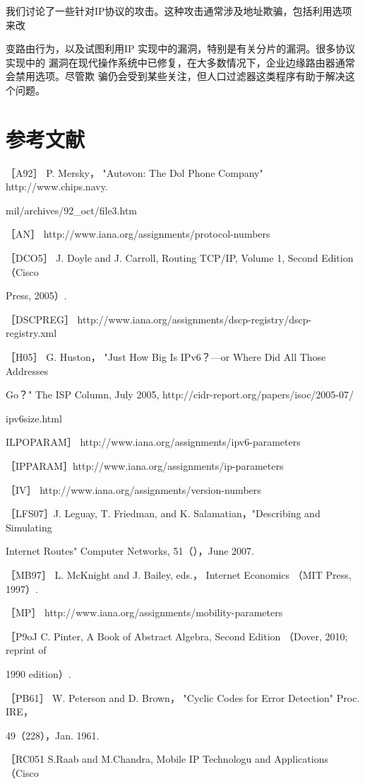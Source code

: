我们讨论了一些针对IP协议的攻击。这种攻击通常涉及地址欺骗，包括利用选项来改

变路由行为，以及试图利用IP 实现中的漏洞，特别是有关分片的漏洞。很多协议实现中的
漏洞在现代操作系统中已修复，在大多数情况下，企业边缘路由器通常会禁用选项。尽管欺
骗仍会受到某些关注，但人口过滤器这类程序有助于解决这个问题。

\section{参考文献}

［A92］ P. Mersky， "Autovon: The Dol Phone Company" http://www.chips.navy.

mil/archives/92\_oct/file3.htm

［AN］ http://www.iana.org/assignments/protocol-numbers

［DCO5］ J. Doyle and J. Carroll, Routing TCP/IP, Volume 1, Second Edition （Cisco

Press, 2005）.

［DSCPREG］ http://www.iana.org/assignments/dscp-registry/dscp-registry.xml

［H05］ G. Huston， "Just How Big Is IPv6？—or Where Did All Those Addresses

Go？" The ISP Column, July 2005, http://cidr-report.org/papers/isoc/2005-07/

ipv6size.html

ILPOPARAM］ http://www.iana.org/assignments/ipv6-parameters

［IPPARAM］http://www.iana.org/assignments/ip-parameters

［IV］ http://www.iana.org/assignments/version-numbers

［LFS07］J. Leguay, T. Friedman, and K. Salamatian，"Describing and Simulating

Internet Routes" Computer Networks, 51（），June 2007.

［MB97］ L. McKnight and J. Bailey, eds.， Internet Economics （MIT Press, 1997）.

［MP］ http://www.iana.org/assignments/mobility-parameters

［P9oJ C. Pinter, A Book of Abstract Algebra, Second Edition （Dover, 2010; reprint of

1990 edition）.

［PB61］ W. Peterson and D. Brown， "Cyclic Codes for Error Detection" Proc. IRE，

49（228），Jan. 1961.

［RC051 S.Raab and M.Chandra, Mobile IP Technologu and Applications （Cisco

